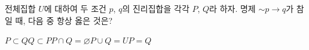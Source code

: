 전체집합 $U$에 대하여 두 조건 $p$, $q$의 진리집합을 각각 $P$, $Q$라 하자. 명제 $\sim p\longrightarrow q$가 참일 때, 다음 중 항상 옳은 것은?
\begin{choices32}{$P\subset Q$}{$Q\subset P$}{$P\cap Q=\varnothing$}{$P\cup Q=U$}{$P=Q$}\end{choices32}
